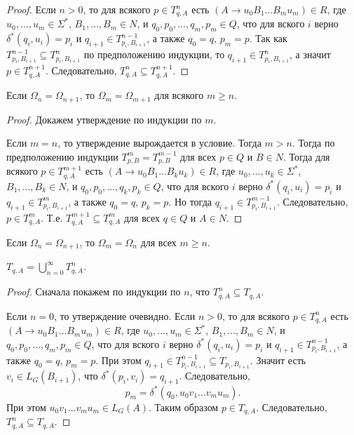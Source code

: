 \documentclass[12pt,a4paper]{article}
\begin{document}
\begin{problem}{2}
\begin{proof}
            Если $n > 0$, то для всякого $p \in T^n_{q, A}$ есть $(A \to u_0 B_1 \dots B_m u_m) \in R$, где $u_0, \dots, u_m \in \Sigma^*$, $B_1, \dots, B_m \in N$, и $q_0, p_0, \dots, q_m, p_m \in Q$, что для вского $i$ верно $\delta^*(q_i, u_i) = p_i$ и $q_{i+1} \in T^{n-1}_{p_i, B_{i+1}}$, а также $q_0 = q$, $p_m = p$. Так как $T^{n-1}_{p_i, B_{i+1}} \subseteq T^n_{p_i, B_{i+1}}$ по предположению индукции, то $q_{i+1} \in T^n_{p_i, B_{i+1}}$, а значит $p \in T^{n+1}_{q, A}$. Следовательно, $T^n_{q, A} \subseteq T^{n+1}_{q, A}$.
        \end{proof}

        \begin{lemma}
            Если $\Omega_n = \Omega_{n+1}$, то $\Omega_m = \Omega_{m+1}$ для всякого $m \geqslant n$.
        \end{lemma}

        \begin{proof}
            Докажем утверждение по индукции по $m$.

            Если $m = n$, то утверждение вырождается в условие. Тогда $m > n$. Тогда по предположению индукции $T^m_{p, B} = T^{m-1}_{p, B}$ для всех $p \in Q$ и $B \in N$. Тогда для всякого $p \in T^{m+1}_{q, A}$ есть $(A \to u_0 B_1 \dots B_k u_k) \in R$, где $u_0, \dots, u_k \in \Sigma^*$, $B_1, \dots, B_k \in N$, и $q_0, p_0, \dots, q_k, p_k \in Q$, что для вского $i$ верно $\delta^*(q_i, u_i) = p_i$ и $q_{i+1} \in T^m_{p_i, B_{i+1}}$, а также $q_0 = q$, $p_k = p$. Но тогда $q_{i+1} \in T^{m-1}_{p_i, B_{i+1}}$. Следовательно, $p \in T^m_{q, A}$. Т.е. $T^{m+1}_{q, A} \subseteq T^m_{q, A}$ для всех $q \in Q$ и $A \in N$.
        \end{proof}

        \begin{corollary}
            Если $\Omega_n = \Omega_{n+1}$, то $\Omega_m = \Omega_n$ для всех $m \geqslant n$.
        \end{corollary}

        \begin{lemma}
            $T_{q, A} = \bigcup_{n=0}^\infty T^n_{q, A}$.
        \end{lemma}

        \begin{proof}
            Сначала покажем по индукции по $n$, что $T^n_{q, A} \subseteq T_{q, A}$.

            Если $n = 0$, то утверждение очевидно. Если $n > 0$, то для всякого $p \in T^n_{q, A}$ есть $(A \to u_0 B_1 \dots B_m u_m) \in R$, где $u_0, \dots, u_m \in \Sigma^*$, $B_1, \dots, B_m \in N$, и $q_0, p_0, \dots, q_m, p_m \in Q$, что для вского $i$ верно $\delta^*(q_i, u_i) = p_i$ и $q_{i+1} \in T^{n-1}_{p_i, B_{i+1}}$, а также $q_0 = q$, $p_m = p$. При этом $q_{i+1} \in T^{n-1}_{p_i, B_{i+1}} \subseteq T_{p_i, B_{i+1}}$. Значит есть $v_i \in L_G(B_{i+1})$, что $\delta^*(p_i, v_i) = q_{i+1}$. Следовательно,
            \[p_m = \delta^*(q_0, u_0 v_1 \dots v_m u_m).\]
            При этом $u_0 v_1 \dots v_m u_m \in L_G(A)$. Таким образом $p \in T_{q, A}$. Следовательно, $T^n_{q, A} \subseteq T_{q, A}$.


\end{proof}
\end{problem}
\end{document}

